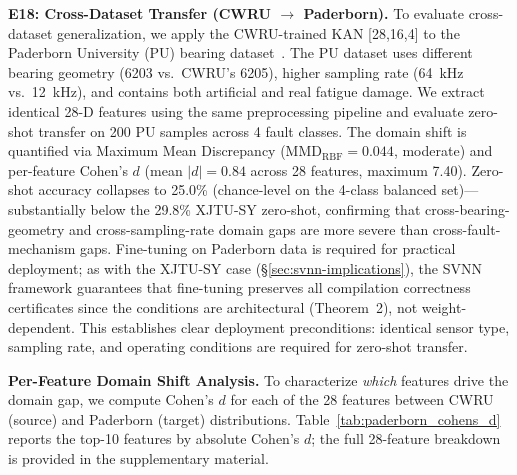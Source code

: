 \documentclass[journal,onecolumn]{IEEEtran}
\begin{document}
\noindent\textbf{E18: Cross-Dataset Transfer (CWRU $\rightarrow$ Paderborn).}
To evaluate cross-dataset generalization, we apply the CWRU-trained
KAN [28,16,4] to the Paderborn University (PU) bearing
dataset~\cite{lessmeier2016paderborn}. The PU dataset uses different
bearing geometry (6203 vs.\ CWRU's 6205), higher sampling rate
(64~kHz vs.\ 12~kHz), and contains both artificial and real fatigue
damage. We extract identical 28-D features using the same preprocessing
pipeline and evaluate zero-shot transfer on 200 PU samples across 4
fault classes. The domain shift is quantified via Maximum Mean
Discrepancy (MMD$_{\text{RBF}} = 0.044$, moderate) and per-feature
Cohen's $d$ (mean $|d| = 0.84$ across 28 features, maximum 7.40).
Zero-shot accuracy collapses to 25.0\% (chance-level on the 4-class
balanced set)---substantially below the 29.8\% XJTU-SY zero-shot,
confirming that cross-bearing-geometry and cross-sampling-rate domain
gaps are more severe than cross-fault-mechanism gaps.
Fine-tuning on Paderborn data is required for practical deployment;
as with the XJTU-SY case ({\S}\ref{sec:svnn-implications}), the SVNN
framework guarantees that fine-tuning preserves all compilation
correctness certificates since the conditions are architectural
(Theorem~2), not weight-dependent. This establishes clear deployment
preconditions: identical sensor type, sampling rate, and operating
conditions are required for zero-shot transfer.

\vspace{4pt}
\noindent\textbf{Per-Feature Domain Shift Analysis.}
To characterize \textit{which} features drive the domain gap, we compute
Cohen's $d$ for each of the 28 features between CWRU (source) and Paderborn
(target) distributions. Table~\ref{tab:paderborn_cohens_d} reports the top-10
features by absolute Cohen's $d$; the full 28-feature breakdown is provided
in the supplementary material.
\end{document}
